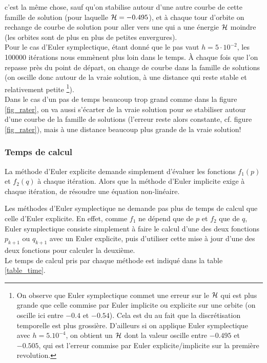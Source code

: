 c'est la même chose, sauf qu'on stabilise autour d'une autre courbe de cette famille de solution (pour laquelle $\mathcal{H} = -0.495$), et à chaque tour d'orbite on rechange de courbe de solution pour aller vers une qui a une énergie $\mathcal{H}$ moindre (les orbites sont de plus en plus de petites envergures).\\
Pour le cas d'Euler symplectique, étant donné que le pas vaut $h=5 \cdot 10^{-2}$, les 100000 itérations nous emmènent plus loin dans le temps.
À chaque fois que l'on repasse près du point de départ,
on change de courbe dans la famille de solutions (on oscille donc autour de la vraie solution,
à une distance qui reste stable et relativement petite
\footnote{On observe que Euler symplectique commet une erreur sur le $\mathcal{H}$ qui est plus grande que celle commise par Euler implicite ou explicite sur une orbite (on oscille ici entre $-0.4$ et $-0.54$).
Cela est du au fait que la discrétisation temporelle est plus grossière.
D'ailleurs si on applique Euler symplectique avec $h=5.10^{-4}$, on obtient un $\mathcal{H}$ dont la valeur oscille entre $-0.495$ et $-0.505$, qui est l'erreur commise par Euler explicite/implicite sur la première revolution.}).\\
Dans le cas d'un pas de temps beaucoup trop grand comme dans la figure \ref{fig_rater},
on va aussi s'écarter de la vraie solution pour se stabiliser autour d'une courbe de la famille de solutions
(l'erreur reste alors constante, cf. figure \ref{fig_rater}), mais à une distance beaucoup plus grande de la vraie solution!



\subsubsection{Temps de calcul}
La méthode d'Euler explicite demande simplement d'évaluer les fonctions $f_1(p)$ et $f_2(q)$ à chaque itération.
Alors que la méthode d'Euler implicite exige à chaque itération,
de résoudre une équation non-linéaire.


Les méthodes d'Euler symplectique ne demande pas plus de temps de calcul que celle d'Euler explicite. En effet, comme $f_1$ ne dépend que de $p$ et $f_2$ que de $q$, Euler symplectique consiste simplement à faire le calcul d'une des deux fonctions $p_{k+1}$ ou $q_{k+1}$ avec un Euler explicite, puis d'utiliser cette mise à jour d'une des deux fonctions pour calculer la deuxième. \\
Le temps de calcul pris par chaque méthode est indiqué dans la table \ref{table_time}.


